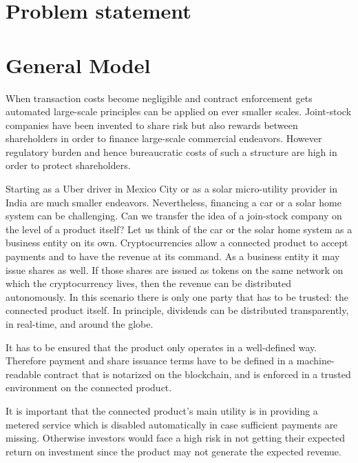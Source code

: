 \section{Problem statement}


\section{General Model}

When transaction costs become negligible and contract enforcement gets automated large-scale principles can be applied on ever smaller scales. Joint-stock companies have been invented to share risk but also rewards between shareholders in order to finance large-scale commercial endeavors. However regulatory burden and hence bureaucratic costs of such a structure are high in order to protect shareholders.   

Starting as a Uber driver in Mexico City or as a solar micro-utility provider in India are much smaller endeavors. Nevertheless, financing a car or a solar home system can be challenging. Can we transfer the idea of a join-stock company on the level of a product itself? Let us think of the car or the solar home system as a business entity on its own. Cryptocurrencies allow a connected product to accept payments and to have the revenue at its command. As a business entity it may issue shares as well. If those shares are issued as tokens on the same network on which the cryptocurrency lives, then the revenue can be distributed autonomously. In this scenario there is only one party that has to be trusted: the connected product itself. In principle, dividends can be distributed transparently, in real-time, and around the globe.

It has to be ensured that the product only operates in a well-defined way. Therefore payment and share issuance terms have to be defined in a machine-readable contract that is notarized on the blockchain, and is enforced in a trusted environment on the connected product. 

It is important that the connected product's main utility is in providing a metered service which is disabled automatically in case sufficient payments are missing. Otherwise investors would face a high risk in not getting their expected return on investment since the product may not generate the expected revenue.

